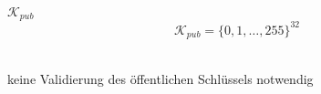 \begin{frame}{$\mathcal{K}_{pub}$}
    \[\mathcal{K}_{pub} = \{0,1,\dots,255\}^{32}\] \\
    \begin{center}
        keine Validierung des öffentlichen Schlüssels notwendig
    \end{center}
\end{frame} 